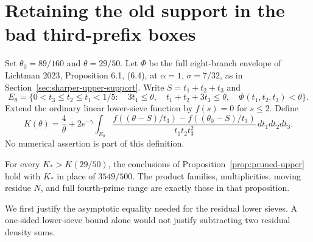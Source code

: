 \section{Retaining the old support in the bad third-prefix boxes}
\label{sec:retained-base-upper}

Set $\theta_0=89/160$ and $\theta=29/50$. Let $\Phi$ be the full
eight-branch envelope of Lichtman 2023, Proposition 6.1, (6.4), at
$\alpha=1$, $\sigma=7/32$, as in Section~\ref{sec:sharper-upper-support}.
Write $S=t_1+t_2+t_3$ and
\[
 E_\theta=\{0<t_3\le t_2\le t_1<1/5:\quad
 3t_1\le\theta,\quad t_1+t_2+3t_3\le\theta,\quad
 \Phi(t_1,t_2,t_3)<\theta\}.
\]
Extend the ordinary linear lower-sieve function by $f(s)=0$ for
$s\le2$. Define
\begin{equation}\label{eq:retained-base-functional}
 K(\theta)=\frac4\theta+2e^{-\gamma}
 \int_{E_\theta}
 \frac{f((\theta-S)/t_3)-f((\theta_0-S)/t_3)}
 {t_1t_2t_3^2}\,dt_1dt_2dt_3.
\end{equation}
No numerical assertion is part of this definition.

\begin{proposition}
\label{prop:retained-base-upper}
For every $K_*>K(29/50)$, the conclusions of
Proposition~\ref{prop:pruned-upper} hold with $K_*$ in place of
$3549/500$. The product families, multiplicities, moving residue $N$,
and full fourth-prime range are exactly those in that proposition.
\end{proposition}

We first justify the asymptotic equality needed for the residual lower
sieves. A one-sided lower-sieve bound alone would not justify subtracting
two residual density sums.

